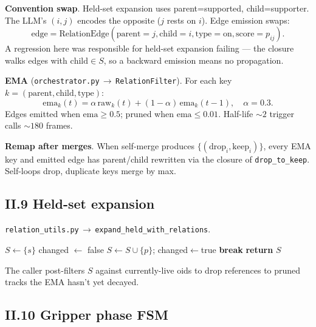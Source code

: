 \documentclass[11pt]{article}
\newcommand{\file}[1]{\texttt{#1}}
\begin{document}
\textbf{Convention swap}. Held-set expansion uses
parent=supported, child=supporter. The LLM's $(i,j)$ encodes the
opposite ($j$ rests on $i$). Edge emission swaps:
$$\mathrm{edge} = \mathrm{RelationEdge}(\text{parent}=j,\text{child}=i,\text{type}=\text{on},\text{score}=p_{ij}).$$
A regression here was responsible for held-set expansion failing —
the closure walks edges with $\text{child}\in S$, so a backward
emission means no propagation.

\textbf{EMA}
(\file{orchestrator.py}\,$\to$\,\texttt{RelationFilter}). For each
key $k=(\text{parent},\text{child},\text{type})$:
$$\mathrm{ema}_k(t) = \alpha\,\mathrm{raw}_k(t) + (1-\alpha)\,\mathrm{ema}_k(t-1),\quad \alpha=0.3.$$
Edges emitted when $\mathrm{ema}\ge 0.5$; pruned when
$\mathrm{ema}\le 0.01$. Half-life $\sim 2$ trigger calls
$\sim 180$ frames.

\textbf{Remap after merges}. When self-merge produces
$\{(\text{drop}_i,\text{keep}_i)\}$, every EMA key and emitted edge
has parent/child rewritten via the closure of \texttt{drop\_to\_keep}.
Self-loops drop, duplicate keys merge by max.

\subsection*{II.9 Held-set expansion}

\file{relation\_utils.py}\,$\to$\,\texttt{expand\_held\_with\_relations}.

\begin{algorithm}[H]
\begin{algorithmic}[1]
\State $S \gets \{s\}$
  \State changed $\gets$ false
     $S \gets S\cup\{p\}$; changed$\gets$true \EndIf
  \EndFor
   \textbf{break} \EndIf
\EndFor
\State \textbf{return} $S$
\end{algorithmic}
\end{algorithm}
The caller post-filters $S$ against currently-live oids to drop
references to pruned tracks the EMA hasn't yet decayed.

\subsection*{II.10 Gripper phase FSM}
\end{document}
